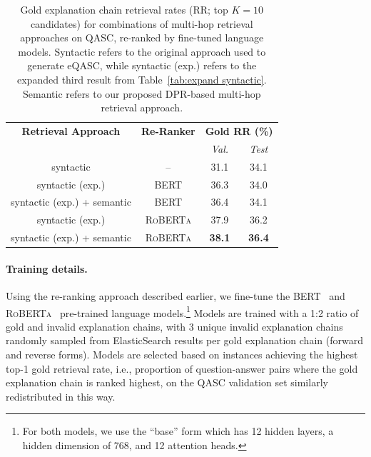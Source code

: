 \documentclass[letterpaper]{article} %
\begin{document}
\begin{table}
    \centering
    \footnotesize
    \begin{tabular}{c|c|cc}
    \toprule
        \textbf{Retrieval Approach}  & \textbf{Re-Ranker} &\multicolumn{2}{c}{\textbf{Gold RR (\%)}} \\
         & & \textit{Val.} & \textit{Test} \\\midrule
        syntactic & -- & 31.1 & 34.1 \\\midrule
        syntactic (exp.) & \textsc{BERT} & 36.3 & 34.0 \\
        syntactic (exp.) + semantic & \textsc{BERT} & {36.4} & {34.1} \\\midrule
        syntactic (exp.) & \textsc{RoBERTa} & 37.9 & 36.2 \\
        syntactic (exp.) + semantic & \textsc{RoBERTa} & \textbf{38.1} & \textbf{36.4} \\
        \bottomrule
    \end{tabular}
    \normalsize
    \caption{Gold explanation chain retrieval rates (RR; top $K=10$ candidates) for combinations of multi-hop retrieval approaches on QASC, re-ranked by fine-tuned language models. Syntactic refers to the original approach used to generate eQASC, while syntactic (exp.) refers to the expanded third result from Table~\ref{tab:expand syntactic}. Semantic refers to our proposed DPR-based multi-hop retrieval approach.}
    \label{tab:reranking}
\end{table}

\paragraph{Training details.}
Using the re-ranking approach described earlier, we fine-tune the \textsc{BERT}~\cite{devlin-etal-2019-bert} and \textsc{RoBERTa}~\cite{liu2019roberta} %
pre-trained language models.\footnote{For both models, we use the ``base'' form which has 12 hidden layers, a hidden dimension of 768, and 12 attention heads.} Models are trained with a 1:2 ratio of gold and invalid explanation chains, with 3 unique invalid explanation chains randomly sampled from ElasticSearch results per gold explanation chain (forward and reverse forms). Models are selected based on instances achieving the highest top-1 gold retrieval rate, i.e., proportion of question-answer pairs where the gold explanation chain is ranked highest, on the QASC validation set similarly redistributed in this way.
\end{document}
